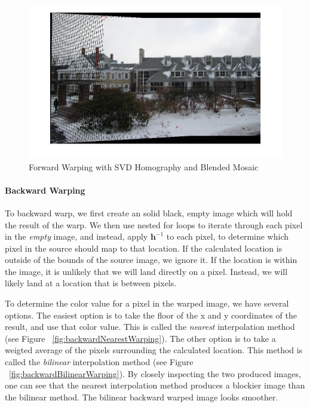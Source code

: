 \documentclass[11pt, letterpaper]{article}
\begin{document}
\begin{figure}[here]
\includegraphics[width=\textwidth]{../pics/snow-svd-forward-blended.jpg}
\caption{Forward Warping with SVD Homography and Blended Mosaic}
\label{fig:forwardWarping}
\end{figure}

\paragraph{Backward Warping}
To backward warp, we first create an solid black, empty image which
will hold the result of the warp. We then use nested for loops to
iterate through each pixel in the \emph{empty} image, and instead,
apply $\mathbf{h}^{-1}$ to each pixel, to determine which pixel in the
source should map to that location. If the calculated location is
outside of the bounds of the source image, we ignore it. If the
location is within the image, it is unlikely that we will land
directly on a pixel. Instead, we will likely land at a location that
is between pixels. 

To determine the color value for a pixel in the warped image, we have
several options. The easiest option is to take the floor of the x and
y coordinates of the result, and use that color value. This is called
the \emph{nearest} interpolation method (see Figure
~\ref{fig:backwardNearestWarping}). The other option is to take a
weigted average of the pixels surrounding the calculated
location. This method is called the \emph{bilinear} interpolation
method (see Figure ~\ref{fig:backwardBilinearWarping}). By closely
inspecting the two produced images, one can see that the nearest
interpolation method produces a blockier image than the bilinear
method. The bilinear backward warped image looks smoother.
\end{document}
